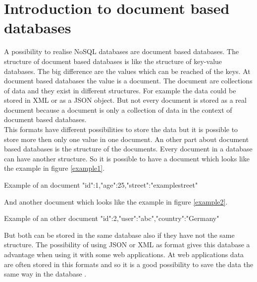 \section{Introduction to document based databases}
A possibility to realise NoSQL databases are document based databases. The structure of document based databases is like the structure of key-value databases. The big difference are the values which can be reached of the keys. At document based databases the value is a document. The document are collections of data and they exist in different structures. For example the data could be stored in XML or as a JSON object. But not every document is stored as a real document because a document is only a collection of data in the context of document based databases. \\
This formats have different possibilities to store the data but it is possible to store more then only one value in one document. An other part about document based databases is the structure of the documents. Every document in a database can have another structure. 
So it is possible to have a document which looks like the example in figure \ref{example1}.
\begin{mylisting}{\label{example1} Example of an document}
{"id":1,"age":25,"street":"examplestreet"}
\end{mylisting}
And another document which looks like the example in figure \ref{example2}. 
\begin{mylisting}{\label{example2} Example of an other document}
{"id":2,"user":"abc","country":"Germany"}
\end{mylisting}
%
But both can be stored in the same database also if they have not the same structure. 
The possibility of using JSON or XML as format gives this database a advantage when using it with some web applications. At web applications data are often stored in this formats and so it is a good possibility to save the data the same way in the database \parencite{DocDBIntro1,DocDBIntro2,DocDBIntro3}.
